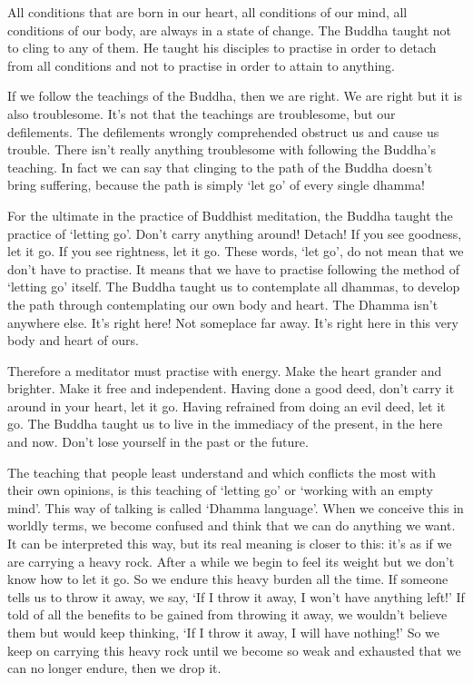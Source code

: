 All conditions that are born in our heart, all conditions of our mind, all conditions of our body, are always in a state of change. The Buddha taught not to cling to any of them. He taught his disciples to practise in order to detach from all conditions and not to practise in order to attain to anything. 

If we follow the teachings of the Buddha, then we are right. We are right but it is also troublesome. It's not that the teachings are troublesome, but our defilements. The defilements wrongly comprehended obstruct us and cause us trouble. There isn't really anything troublesome with following the Buddha's teaching. In fact we can say that clinging to the path of the Buddha doesn't bring suffering, because the path is simply `let go' of every single dhamma! 

For the ultimate in the practice of Buddhist meditation, the Buddha taught the practice of `letting go'. Don't carry anything around! Detach! If you see goodness, let it go. If you see rightness, let it go. These words, `let go', do not mean that we don't have to practise. It means that we have to practise following the method of `letting go' itself. The Buddha taught us to contemplate all dhammas, to develop the path through contemplating our own body and heart. The Dhamma isn't anywhere else. It's right here! Not someplace far away. It's right here in this very body and heart of ours. 

Therefore a meditator must practise with energy. Make the heart grander and brighter. Make it free and independent. Having done a good deed, don't carry it around in your heart, let it go. Having refrained from doing an evil deed, let it go. The Buddha taught us to live in the immediacy of the present, in the here and now. Don't lose yourself in the past or the future. 

The teaching that people least understand and which conflicts the most with their own opinions, is this teaching of `letting go' or `working with an empty mind'. This way of talking is called `Dhamma language'. When we conceive this in worldly terms, we become confused and think that we can do anything we want. It can be interpreted this way, but its real meaning is closer to this: it's as if we are carrying a heavy rock. After a while we begin to feel its weight but we don't know how to let it go. So we endure this heavy burden all the time. If someone tells us to throw it away, we say, `If I throw it away, I won't have anything left!' If told of all the benefits to be gained from throwing it away, we wouldn't believe them but would keep thinking, `If I throw it away, I will have nothing!' So we keep on carrying this heavy rock until we become so weak and exhausted that we can no longer endure, then we drop it. 

